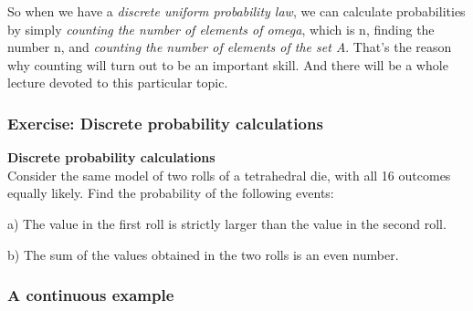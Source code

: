 \documentclass[pdftex, brazil, 12pt, twoside]{article}
\begin{document}
\begin{figure}[H]
  \begin{center}
  \end{center}
\end{figure}

So when we have a \emph{discrete uniform probability law}, we
can calculate probabilities by simply \emph{counting the number of
elements of omega}, which is n, finding the number n, and
\emph{counting the number of elements of the set A}. That's
the reason why counting will turn out to be
an important skill.
And there will be a whole lecture devoted to this
particular topic.

\subsubsection{Exercise: Discrete probability calculations}
\label{un1-lec1-exec-discrete-probability}

\begin{exercise}
  \textbf{Discrete probability calculations}\\
  Consider the same model of two rolls of a tetrahedral die, with all 16 outcomes
  equally likely. Find the probability of the following events:

  a) The value in the first roll is strictly larger than the value in the second roll.
  
  b) The sum of the values obtained in the two rolls is an even number.
\end{exercise}

\subsubsection{A continuous example}
\label{un1-lec1-continuous-example}
\end{document}
